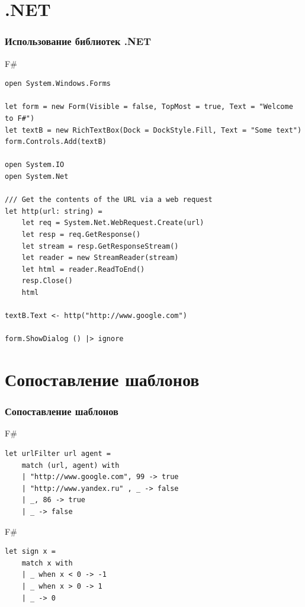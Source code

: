 \documentclass[xetex,mathserif,serif]{beamer}
\begin{document}
	\section{.NET}

	\begin{frame}[fragile]
		\frametitle{Использование библиотек .NET}
		\begin{tiny}
		\begin{exampleblock}{F\#}
			\begin{verbatim}
open System.Windows.Forms

let form = new Form(Visible = false, TopMost = true, Text = "Welcome to F#")
let textB = new RichTextBox(Dock = DockStyle.Fill, Text = "Some text")
form.Controls.Add(textB)

open System.IO
open System.Net

/// Get the contents of the URL via a web request
let http(url: string) =
    let req = System.Net.WebRequest.Create(url)
    let resp = req.GetResponse()
    let stream = resp.GetResponseStream()
    let reader = new StreamReader(stream)
    let html = reader.ReadToEnd()
    resp.Close()
    html

textB.Text <- http("http://www.google.com")

form.ShowDialog () |> ignore
			\end{verbatim}
		\end{exampleblock}
		\end{tiny}
\end{frame}

	\section{Сопоставление шаблонов}
	
	\begin{frame}[fragile]
		\frametitle{Сопоставление шаблонов}
		\begin{exampleblock}{F\#}
			\begin{verbatim}
let urlFilter url agent =
    match (url, agent) with
    | "http://www.google.com", 99 -> true
    | "http://www.yandex.ru" , _ -> false
    | _, 86 -> true
    | _ -> false
			\end{verbatim}
		\end{exampleblock}

		\begin{exampleblock}{F\#}
			\begin{verbatim}
let sign x =
    match x with
    | _ when x < 0 -> -1
    | _ when x > 0 -> 1
    | _ -> 0
			\end{verbatim}
		\end{exampleblock}
\end{frame}
\end{document}

